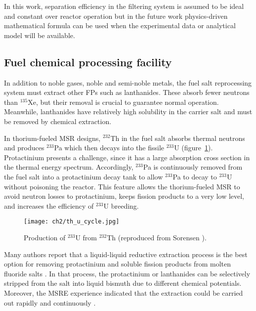 In this work, separation efficiency in the filtering system is assumed to be 
ideal and constant over reactor operation but in the future work 
physics-driven mathematical formula can be used when the experimental data or 
analytical model will be available.


\subsection{Fuel chemical processing facility} \label{sec:chemical_processing}
In addition to noble gases, noble and semi-noble metals, the fuel salt 
reprocessing system must extract other \glspl{FP} such as lanthanides. These 
absorb fewer neutrons than $^{135}$Xe, but their removal is crucial to 
guarantee normal operation. Meanwhile, lanthanides have relatively high 
solubility in the carrier salt and must be removed by chemical extraction. 

In thorium-fueled \gls{MSR} designs, $^{232}$Th in the fuel salt absorbs 
thermal neutrons and produces $^{233}$Pa which then decays into the fissile 
$^{233}$U (figure~\ref{fig:th_u_reaction}). Protactinium presents a challenge, 
since it has a large absorption cross section in the thermal energy spectrum. 
Accordingly, $^{233}$Pa is continuously removed from the fuel salt into a 
protactinium decay tank to allow $^{233}$Pa to decay to $^{233}$U without 
poisoning the reactor. This feature allows the thorium-fueled \gls{MSR} to 
avoid neutron losses to protactinium, keeps fission products to a very low 
level, and increases the efficiency of $^{233}$U breeding. 

\begin{figure}[htp!] %
	\centering
	\texttt{[image: ch2/th\_u\_cycle.jpg]}
	\caption{Production of $^{233}$U from $^{232}$Th  (reproduced from 
	Sorensen \cite{sorensen_one-fluid_2006}).}
	\label{fig:th_u_reaction}
\end{figure}

Many authors report that a liquid-liquid reductive extraction process is the 
best option for removing protactinium and soluble fission products from 
molten fluoride salts \cite{briggs_molten-salt_1969, delpech_molten_2010, 
	doligez_coupled_2014}. In that process, the protactinium or lanthanides 
	can be 
selectively stripped from the salt into liquid bismuth due to different 
chemical potentials. Moreover, the \gls{MSRE} experience indicated that the 
extraction could be carried out rapidly and continuously  
\cite{whatley_engineering_1970}.

